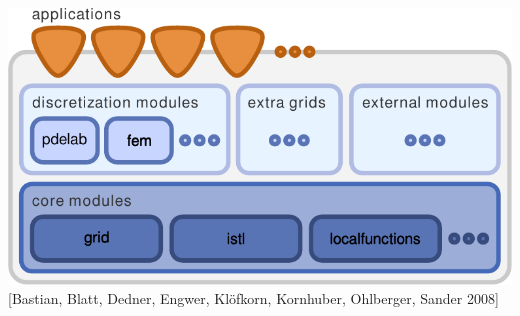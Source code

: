 \documentclass[ignorenonframetext,11pt]{beamer}
\theoremstyle{definition}
\begin{document}
\begin{frame}
\begin{minipage}[t]{0.54\textwidth}
\begin{itemize}
        \end{itemize}
    \end{minipage}
  \hspace*{.4cm}
    \begin{minipage}[t]{0.45\textwidth}
      \mbox{}
      \begin{center}
        \includegraphics[width=\linewidth]{intro/dunedesign}\\
        \scriptsize [Bastian,
        Blatt, Dedner, Engwer, Kl{\"{o}}fkorn, Kornhuber,
        Ohlberger, Sander 2008]
      \end{center}
    \end{minipage}
\end{frame}
\end{document}
